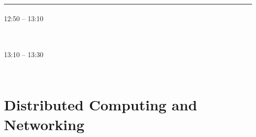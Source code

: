             
            \\ 
            \noindent\rule{\textwidth}{0.4pt}
\vspace*{-36pt}\subsection[ 
    	   {\bf Performance testing and functional limitations of Normalized Autobinomial Markov Channels
           } \\
           {\it Cosmin \cb{T}oca, Carmen P\u{a}tra\cb{s}cu, Mihai Ciuc
           }
	]
	    {
            }
	    12:50 -- 13:10 \nopagebreak

            
            \\ 
\pagebreak
\vspace*{-36pt}\subsection[ 
    	   {\bf Pedestrian detection and vehicle type recognition using CENTROG features for nighttime thermal images
           } \\
           {\it Martins E. Irhebhude, Mohammad A. Ali, Eran A. Edirisinghe
           }
	]
	    {
            }
	    13:10 -- 13:30 \nopagebreak

            
            \\ 





\part{Distributed Computing and Networking}

